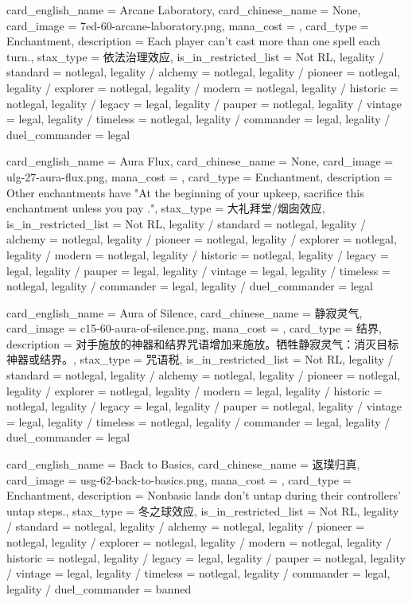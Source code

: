 \documentclass[lang = cn, color = black, 10pt]{AllThatStax}
\begin{document}
\card
{
	card_english_name = {Arcane Laboratory},
	card_chinese_name = {None},
	card_image = 7ed-60-arcane-laboratory.png,
	mana_cost = ,
	card_type = Enchantment,
	description = {Each player can't cast more than one spell each turn.},
	stax_type = 依法治理效应,
	is_in_restricted_list = Not RL,
	legality / standard = notlegal,
	legality / alchemy = notlegal,
	legality / pioneer = notlegal,
	legality / explorer = notlegal,
	legality / modern = notlegal,
	legality / historic = notlegal,
	legality / legacy = legal,
	legality / pauper = notlegal,
	legality / vintage = legal,
	legality / timeless = notlegal,
	legality / commander = legal,
	legality / duel_commander = legal
}

\card
{
	card_english_name = {Aura Flux},
	card_chinese_name = {None},
	card_image = ulg-27-aura-flux.png,
	mana_cost = ,
	card_type = Enchantment,
	description = {Other enchantments have "At the beginning of your upkeep, sacrifice this enchantment unless you pay ."},
	stax_type = 大礼拜堂/烟囱效应,
	is_in_restricted_list = Not RL,
	legality / standard = notlegal,
	legality / alchemy = notlegal,
	legality / pioneer = notlegal,
	legality / explorer = notlegal,
	legality / modern = notlegal,
	legality / historic = notlegal,
	legality / legacy = legal,
	legality / pauper = legal,
	legality / vintage = legal,
	legality / timeless = notlegal,
	legality / commander = legal,
	legality / duel_commander = legal
}

\card
{
	card_english_name = {Aura of Silence},
	card_chinese_name = {静寂灵气},
	card_image = c15-60-aura-of-silence.png,
	mana_cost = ,
	card_type = 结界,
	description = {对手施放的神器和结界咒语增加来施放。牺牲静寂灵气：消灭目标神器或结界。},
	stax_type = 咒语税,
	is_in_restricted_list = Not RL,
	legality / standard = notlegal,
	legality / alchemy = notlegal,
	legality / pioneer = notlegal,
	legality / explorer = notlegal,
	legality / modern = legal,
	legality / historic = notlegal,
	legality / legacy = legal,
	legality / pauper = notlegal,
	legality / vintage = legal,
	legality / timeless = notlegal,
	legality / commander = legal,
	legality / duel_commander = legal
}

\card
{
	card_english_name = {Back to Basics},
	card_chinese_name = {返璞归真},
	card_image = usg-62-back-to-basics.png,
	mana_cost = ,
	card_type = Enchantment,
	description = {Nonbasic lands don't untap during their controllers' untap steps.},
	stax_type = 冬之球效应,
	is_in_restricted_list = Not RL,
	legality / standard = notlegal,
	legality / alchemy = notlegal,
	legality / pioneer = notlegal,
	legality / explorer = notlegal,
	legality / modern = notlegal,
	legality / historic = notlegal,
	legality / legacy = legal,
	legality / pauper = notlegal,
	legality / vintage = legal,
	legality / timeless = notlegal,
	legality / commander = legal,
	legality / duel_commander = banned
}
\end{document}
